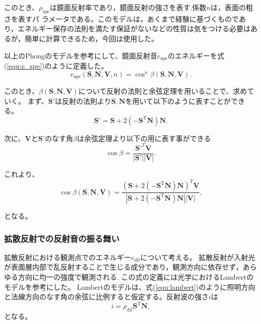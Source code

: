 このとき、$\rho_\mathrm{spe}$は鏡面反射率であり，鏡面反射の強さを表す.係数$n$は，表面の粗さを表すパ ラメータである。このモデルは，あくまで経験に基づくものであり，エネルギー保存の法則を満たす保証がないなどの性質は気をつける必要はあるが，簡単に計算できるため，今回は使用した。

以上のPhongのモデルを参考にして、鏡面反射音$e_\mathrm{spe}$のエネルギーを式(\ref{equ:e_spe})のように定義した。
\begin{equation}
    \label{equ:e_spe}
      e_\mathrm{spe}(\mathbf{S}, \mathbf{N}, \mathbf{V}, n) = \cos^{n}\beta(\mathbf{S}, \mathbf{N}, \mathbf{V}).
\end{equation}

このとき、$\beta(\mathbf{S}, \mathbf{N}, \mathbf{V})$について反射の法則と余弦定理を用いることで、求めていく。
まず、$\mathbf{S'}$は反射の法則より$\mathbf{S}, \mathbf{N}$を用いて以下のように表すことができる。
\begin{equation}
	\mathbf{S'} = \mathbf{S} + 2(- \mathbf{S}^{\mathrm{T}} \mathbf{N}) \mathbf{N}.
\end{equation}

次に、$\mathbf{V}$と$\mathbf{S'}$のなす角$\beta$は余弦定理より以下の用に表す事ができる
\begin{equation}
	\cos\beta = \frac{\mathbf{S'}^{T}\mathbf{V}}{|\mathbf{S'}||\mathbf{V}|}.
\end{equation}

これより、
\begin{equation}
	\cos\beta(\mathbf{S}, \mathbf{N}, \mathbf{V}) = \frac{(\mathbf{S} + 2(- \mathbf{S}^{\mathrm{T}} \mathbf{N}) \mathbf{N})^{T}\mathbf{V}}{|\mathbf{S} + 2(- \mathbf{S}^{\mathrm{T}} \mathbf{N}) \mathbf{N}||\mathbf{V}|},
\end{equation}

となる。

\subsubsection{拡散反射での反射音の振る舞い\label{diff}}
拡散反射における観測点でのエネルギー$e_\mathrm{dif}$について考える。
拡散反射が入射光が表面層内部で乱反射することで生じる成分であり，観測方向に依存せず，あらゆる方向に均一の強度で観測される.
この式の定義には光学におけるLambertのモデル\cite{micheal1994diffusereflection}を参考にした。
Lambertのモデルは、式(\ref{equ:lambert})のように照明方向と法線方向のなす角の余弦に比例すると仮定する。反射波の強さ$i$は
\begin{equation}
	\label{equ:lambert}
	i = \rho_\mathrm{dif}\mathbf{S}^{\mathrm{T}}\mathbf{N},
\end{equation}
となる。

